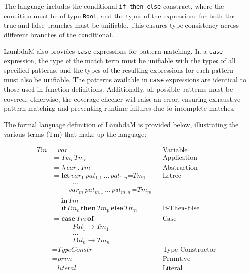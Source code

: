 \documentclass{IEEEtran}
\begin{document}
\par The language includes the conditional \texttt{if-then-else} construct, where the condition must be of type \texttt{Bool}, and the types of the expressions for both the true and false branches must be unifiable. This ensures type consistency across different branches of the conditional.

\par LambdaM also provides \texttt{case} expressions for pattern matching. In a \texttt{case} expression, the type of the match term must be unifiable with the types of all specified patterns, and the types of the resulting expressions for each pattern must also be unifiable. The patterns available in \texttt{case} expressions are identical to those used in function definitions. Additionally, all possible patterns must be covered; otherwise, the coverage checker will raise an error, ensuring exhaustive pattern matching and preventing runtime failures due to incomplete matches.

\par The formal language definition of LambdaM is provided below, illustrating the various terms (Tm) that make up the language:

\begin{align*}
Tm &=  \textit{var} && \text{Variable} \\
   &=  Tm_l \, Tm_r && \text{Application} \\
   &=  \lambda \, \textit{var} \, \textbf{.} \, Tm && \text{Abstraction} \\
   &=  \textbf{let} \, \textit{var}_1 \; pat_{1,1} \, \dots \, pat_{1,n} \textbf{=} Tm_1 && \text{Letrec} \\
   &   \quad \quad \quad \dots \\
   &   \quad \quad \; \, \textit{var}_m \; pat_{m,1} \, \dots \, pat_{m,n} \, \textbf{=} Tm_m \\
   &   \quad \; \textbf{in} \, Tm \\
   &=  \textbf{if} \, Tm_c \, \textbf{then} \, Tm_p \, \textbf{else} \, Tm_n && \text{If-Then-Else} \\
   &=  \textbf{case} \, Tm \, \textbf{of} && \text{Case} \\
   &   \quad \quad \quad Pat_1 \rightarrow Tm_1 \\
   &   \quad \quad \quad \dots \\
   &   \quad \quad \quad Pat_n \rightarrow Tm_n \\
   &=  \textit{TypeConstr} && \text{Type Constructor}\\
   &=  \textit{prim} && \text{Primitive}\\
   &=  \textit{literal} && \text{Literal}
\end{align*}
\end{document}
